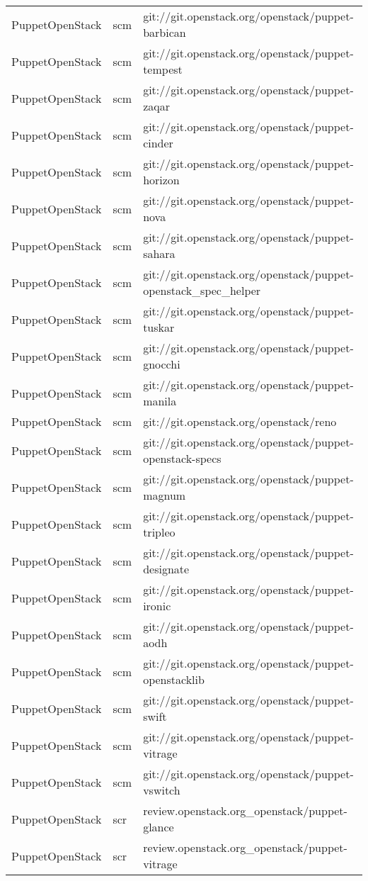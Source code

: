 \begin{center}
\begin{longtable}{|p{4cm}|p{1cm}|p{10cm}|}
PuppetOpenStack&scm&git://git.openstack.org/openstack/puppet-barbican\\ 
PuppetOpenStack&scm&git://git.openstack.org/openstack/puppet-tempest\\ 
PuppetOpenStack&scm&git://git.openstack.org/openstack/puppet-zaqar\\ 
PuppetOpenStack&scm&git://git.openstack.org/openstack/puppet-cinder\\ 
PuppetOpenStack&scm&git://git.openstack.org/openstack/puppet-horizon\\ 
PuppetOpenStack&scm&git://git.openstack.org/openstack/puppet-nova\\ 
PuppetOpenStack&scm&git://git.openstack.org/openstack/puppet-sahara\\ 
PuppetOpenStack&scm&git://git.openstack.org/openstack/puppet-openstack\_spec\_helper\\ 
PuppetOpenStack&scm&git://git.openstack.org/openstack/puppet-tuskar\\ 
PuppetOpenStack&scm&git://git.openstack.org/openstack/puppet-gnocchi\\ 
PuppetOpenStack&scm&git://git.openstack.org/openstack/puppet-manila\\ 
PuppetOpenStack&scm&git://git.openstack.org/openstack/reno\\ 
PuppetOpenStack&scm&git://git.openstack.org/openstack/puppet-openstack-specs\\ 
PuppetOpenStack&scm&git://git.openstack.org/openstack/puppet-magnum\\ 
PuppetOpenStack&scm&git://git.openstack.org/openstack/puppet-tripleo\\ 
PuppetOpenStack&scm&git://git.openstack.org/openstack/puppet-designate\\ 
PuppetOpenStack&scm&git://git.openstack.org/openstack/puppet-ironic\\ 
PuppetOpenStack&scm&git://git.openstack.org/openstack/puppet-aodh\\ 
PuppetOpenStack&scm&git://git.openstack.org/openstack/puppet-openstacklib\\ 
PuppetOpenStack&scm&git://git.openstack.org/openstack/puppet-swift\\ 
PuppetOpenStack&scm&git://git.openstack.org/openstack/puppet-vitrage\\ 
PuppetOpenStack&scm&git://git.openstack.org/openstack/puppet-vswitch\\ 
PuppetOpenStack&scr&review.openstack.org\_openstack/puppet-glance\\ 
PuppetOpenStack&scr&review.openstack.org\_openstack/puppet-vitrage\\ 

\end{longtable}
\end{center}
